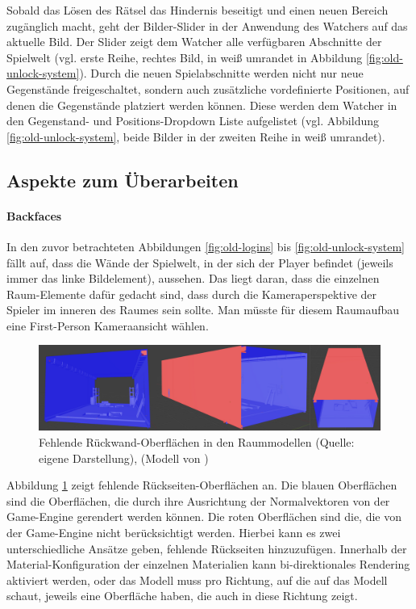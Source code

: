 Sobald das Lösen des Rätsel das Hindernis beseitigt und einen neuen Bereich zugänglich macht, geht der Bilder-Slider in der Anwendung des Watchers auf das aktuelle Bild. Der Slider zeigt dem Watcher alle verfügbaren Abschnitte der Spielwelt (vgl. erste Reihe, rechtes Bild, in weiß umrandet in Abbildung \ref{fig:old-unlock-system}). Durch die neuen Spielabschnitte werden nicht nur neue Gegenstände freigeschaltet, sondern auch zusätzliche vordefinierte Positionen, auf denen die Gegenstände platziert werden können. Diese werden dem Watcher in den Gegenstand- und Positions-Dropdown Liste aufgelistet (vgl. Abbildung \ref{fig:old-unlock-system}, beide Bilder in der zweiten Reihe in weiß umrandet). 

\subsection{Aspekte zum Überarbeiten}
\paragraph{Backfaces}
In den zuvor betrachteten Abbildungen \ref{fig:old-logins} bis \ref{fig:old-unlock-system} fällt auf, dass die Wände der Spielwelt, in der sich der Player befindet (jeweils immer das linke Bildelement),  aussehen. Das liegt daran, dass die einzelnen Raum-Elemente dafür gedacht sind, dass durch die Kameraperspektive der Spieler im inneren des Raumes sein sollte. Man müsste für diesem Raumaufbau eine First-Person Kameraansicht wählen.

\begin{figure}[ht]
\centering
\includegraphics[width=1\linewidth]{content/pictures/Backfaces.png}
\caption{Fehlende Rückwand-Oberflächen in den Raummodellen (Quelle: eigene Darstellung), (Modell von \cite{alasl_autolevel_nodate})}
\label{fig:missing-backfaces}
\end{figure}

Abbildung \ref{fig:missing-backfaces} zeigt fehlende Rückseiten-Oberflächen an. Die blauen Oberflächen sind die Oberflächen, die durch ihre Ausrichtung der Normalvektoren von der Game-Engine gerendert werden können. Die roten Oberflächen sind die, die von der Game-Engine nicht berücksichtigt werden. Hierbei kann es zwei unterschiedliche Ansätze geben, fehlende Rückseiten hinzuzufügen. Innerhalb der Material-Konfiguration der einzelnen Materialien kann bi-direktionales Rendering aktiviert werden, oder das Modell muss pro Richtung, auf die auf das Modell schaut, jeweils eine Oberfläche haben, die auch in diese Richtung zeigt.

